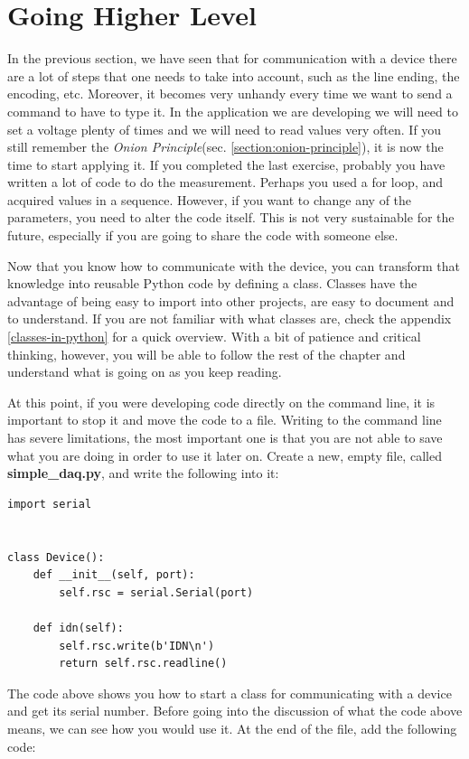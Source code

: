 \section{Going Higher Level}\label{going-higherlevel}
In the previous section, we have seen that for communication with a device there are a lot of steps that one needs to take into account, such as the
line ending, the encoding, etc. Moreover, it becomes very unhandy every time we want
to send a command to have to type it. In the application we are developing we will need to set a voltage plenty of times and we will need to read values very often. If you still remember the \emph{Onion
Principle}(sec. \ref{section:onion-principle}), it is now the time to start applying it. 
If you completed the last exercise, probably you have
written a lot of code to do the measurement. Perhaps you used a for loop, and acquired values in a sequence. However, if you want to change any of the parameters, you need to alter the code itself. This is not very
sustainable for the future, especially if you are going to share the
code with someone else. 

Now that you know how to communicate with the device, you can transform
that knowledge into reusable Python code by defining a class. Classes
have the advantage of being easy to import into other projects, are easy
to document and to understand. If you are not familiar with what classes are, check the appendix \ref{classes-in-python} for a quick overview. With a bit of patience and critical thinking, however, you will be able to follow the rest of the chapter and understand what is going on as you keep reading. 

At this point, if you were developing code directly on the command line, it is important to stop it and move the code to a file. Writing to the command line has severe limitations, the most important one is that you are not able to save what you are doing in order to use it later on. Create a new, empty file, called \textbf{simple\_daq.py}, and write the following into it:

\begin{verbatim}
import serial


class Device():
    def __init__(self, port):
        self.rsc = serial.Serial(port)

    def idn(self):
        self.rsc.write(b'IDN\n')
        return self.rsc.readline()
\end{verbatim}

The code above shows you how to start a class for communicating with
a device and get its serial number. Before going into the discussion of what the code above means, we can see how you would use it. At the end of the file, add the following code: 

